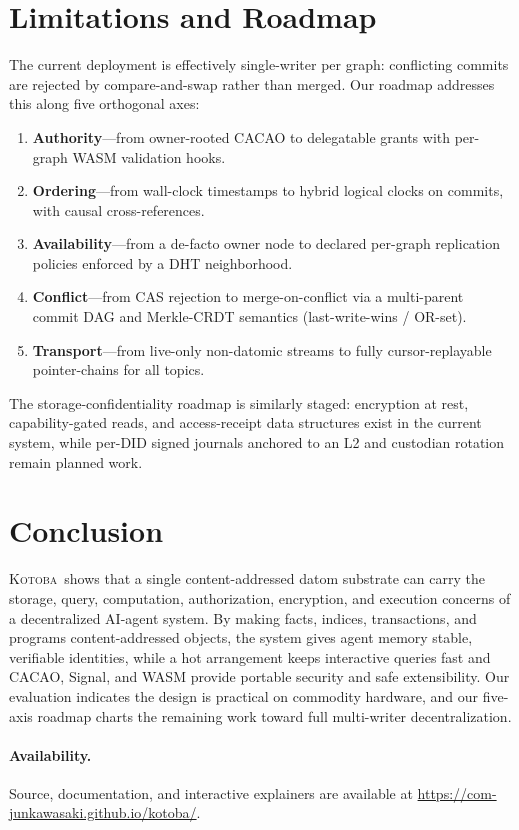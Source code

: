 \documentclass[11pt]{article}
\newcommand{\kotoba}{\textsc{Kotoba}}
\begin{document}
\section{Limitations and Roadmap}
\label{sec:roadmap}

The current deployment is effectively single-writer per graph: conflicting
commits are rejected by compare-and-swap rather than merged. Our roadmap
addresses this along five orthogonal axes:
%
\begin{enumerate}[leftmargin=1.4em,itemsep=2pt]
  \item \textbf{Authority}---from owner-rooted CACAO to delegatable grants with
    per-graph WASM validation hooks.
  \item \textbf{Ordering}---from wall-clock timestamps to hybrid logical clocks
    on commits, with causal cross-references.
  \item \textbf{Availability}---from a de-facto owner node to declared
    per-graph replication policies enforced by a DHT neighborhood.
  \item \textbf{Conflict}---from CAS rejection to merge-on-conflict via a
    multi-parent commit DAG and Merkle-CRDT semantics (last-write-wins / OR-set).
  \item \textbf{Transport}---from live-only non-datomic streams to fully
    cursor-replayable pointer-chains for all topics.
\end{enumerate}
%
The storage-confidentiality roadmap is similarly staged: encryption at rest,
capability-gated reads, and access-receipt data structures exist in the current
system, while per-DID signed journals anchored to an L2 and custodian rotation
remain planned work.

\section{Conclusion}
\label{sec:conclusion}

\kotoba\ shows that a single content-addressed datom substrate can carry the
storage, query, computation, authorization, encryption, and execution concerns of
a decentralized AI-agent system. By making facts, indices, transactions, and
programs content-addressed objects, the system gives agent memory stable,
verifiable identities, while a hot arrangement keeps interactive queries fast
and CACAO, Signal, and WASM provide portable security and safe extensibility.
Our evaluation indicates the design is practical on commodity hardware, and our
five-axis roadmap charts the remaining work toward full multi-writer
decentralization.

\paragraph{Availability.}
Source, documentation, and interactive explainers are available at
\url{https://com-junkawasaki.github.io/kotoba/}.



\end{document}
